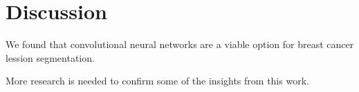 \section{Discussion}
We found that convolutional neural networks are a viable option for breast cancer lession segmentation. 

More research is needed to confirm some of the insights from this work. 

